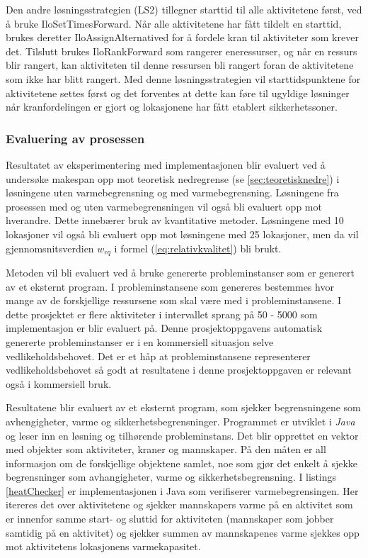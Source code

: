 Den andre løsningsstrategien (LS2) tillegner starttid til alle aktivitetene først, ved å bruke IloSetTimesForward. Når alle aktivitetene har fått tildelt en starttid, brukes deretter IloAssignAlternatived for å fordele kran til aktiviteter som krever det. Tilslutt brukes IloRankForward som rangerer eneressurser, og når en ressurs blir rangert, kan aktiviteten til denne ressursen bli rangert foran de aktivitetene som ikke har blitt rangert. Med denne løsningsstrategien vil starttidspunktene for aktivitetene settes først og det forventes at dette kan føre til ugyldige løsninger når kranfordelingen er gjort og lokasjonene har fått etablert sikkerhetssoner.

\subsubsection{Evaluering av prosessen}
Resultatet av eksperimentering med implementasjonen blir evaluert ved å undersøke makespan opp mot teoretisk nedregrense (se \ref{sec:teoretisknedre}) i løsningene uten varmebegrensning og med varmebegrensning. Løsningene fra prosessen med og uten varmebegrensningen vil også bli evaluert opp mot hverandre. Dette innebærer bruk av kvantitative metoder. Løsningene med 10 lokasjoner vil også bli evaluert opp mot løsningene med 25 lokasjoner, men da vil gjennomsnitsverdien $w_{rq}$ i formel (\ref{eq:relativkvalitet}) bli brukt.

Metoden vil bli evaluert ved å bruke genererte probleminstanser som er generert av et eksternt program. I probleminstansene som genereres bestemmes hvor mange av de forskjellige ressursene som skal være med i probleminstansene. I dette prosjektet er flere aktiviteter i intervallet sprang på 50 - 5000 som implementasjon er blir evaluert på. Denne prosjektoppgavens automatisk genererte probleminstanser er i en kommersiell situasjon selve vedlikeholdsbehovet. Det er et håp at probleminstansene representerer vedlikeholdsbehovet så godt at resultatene i denne prosjektoppgaven er relevant også i kommersiell bruk.

Resultatene blir evaluert av et eksternt program, som sjekker begrensningene som avhengigheter, varme og sikkerhetsbegrensninger. Programmet er utviklet i \textit{Java} og leser inn en løsning og tilhørende probleminstans. Det blir opprettet en vektor med objekter som aktiviteter, kraner og mannskaper. På den måten er all informasjon om de forskjellige objektene samlet, noe som gjør det enkelt å sjekke begrensninger som avhangigheter, varme og sikkerhetsbegrensning. I listings \ref{heatChecker} er implementasjonen i Java som verifiserer varmebegrensingen. Her itereres det over aktivitetene og sjekker mannskapers varme på en aktivitet som er innenfor samme start- og sluttid for aktiviteten (mannskaper som jobber samtidig på en aktivitet) og sjekker summen av mannskapenes varme sjekkes opp mot aktivitetens lokasjonens varmekapasitet.

